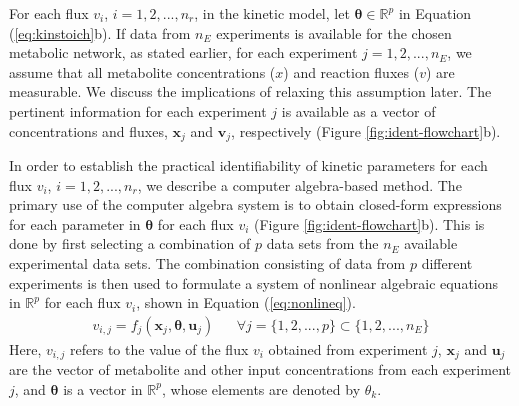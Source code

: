 \documentclass[10pt]{article}
\begin{document}
	
	For each flux $v_i$, $i={1, 2, ..., n_r}$, in the kinetic model, let $\mathbf{\theta} \in \mathbb{R}^p$ in Equation (\ref{eq:kinstoich}b). If data from $n_E$ experiments is available for the chosen metabolic network, as stated earlier, for each experiment $j = {1, 2, ..., n_E}$, we assume that all metabolite concentrations ($x$) and reaction fluxes ($v$) are measurable. We discuss the implications of relaxing this assumption later. The pertinent information for each experiment $j$ is available as a vector of concentrations and fluxes, $\mathbf{x}_j$ and $\mathbf{v}_j$, respectively (Figure \ref{fig:ident-flowchart}b). 
	
	In order to establish the practical identifiability of kinetic parameters for each flux $v_i$, $i={1, 2, ..., n_r}$, we describe a computer algebra-based method. The primary use of the computer algebra system is to obtain closed-form expressions for each parameter in $\mathbf{\theta}$ for each flux $v_i$ (Figure \ref{fig:ident-flowchart}b). This is done by first selecting a combination of $p$ data sets from the $n_{E}$ available experimental data sets. The combination consisting of data from $p$ different experiments is then used to formulate a system of nonlinear algebraic equations in $\mathbb{R}^p$ for each flux $v_i$, shown in Equation (\ref{eq:nonlineq}). 
	\begin{align}\label{eq:nonlineq}
	v_{i, j} = f_j(\mathbf{x}_j,\mathbf{\theta}, \mathbf{u}_j) && \forall j=\{1, 2, ..., p\}\subset\{1, 2, ..., n_E\}
	\end{align}
	Here, $v_{i,j}$ refers to the value of the flux $v_i$ obtained from experiment $j$, $\mathbf{x}_j$ and $\mathbf{u}_j$ are the vector of metabolite and other input concentrations from each experiment $j$, and $\mathbf{\theta}$ is a vector in $\mathbb{R}^p$, whose elements are denoted by $\theta_k$.
	
\end{document}
